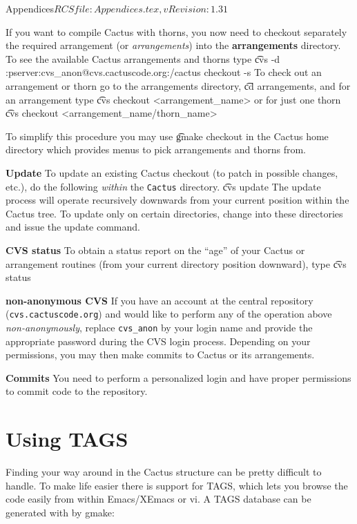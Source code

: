 \begin{cactuspart}{6}{Appendices}{$RCSfile: Appendices.tex,v $}{$Revision: 1.31 $}
\begin{Lentry}
\noindent
  If you want to compile Cactus with thorns, you now need to checkout
  separately the required arrangement (or {\it arrangements})
   into the {\bf arrangements} directory. To see the
  available Cactus arrangements and thorns type
  {\t
    cvs -d :pserver:cvs\_anon@cvs.cactuscode.org:/cactus checkout -s
  }
  To check out an arrangement or thorn go to the arrangements directory,  {\t cd arrangements},
  and  for an arrangement type
{\t
  cvs checkout <arrangement\_name>
  }
        or for just one thorn
{\t
cvs checkout <arrangement\_name/thorn\_name>
}

To simplify this procedure you may use {\t gmake checkout} in the Cactus
home directory which provides menus to pick arrangements and thorns from.


\item[{\bf Update}] To update an existing Cactus checkout (to patch in
  possible changes, etc.), do the following {\em within} the {\tt Cactus} directory.
  {\t
    cvs update
    }
  The update process will operate recursively downwards from your current position
  within the Cactus tree. To update only on certain directories, change
  into these directories and issue the update command.
\item[{\bf CVS status}] To obtain a status report on the ``age'' of your
  Cactus or arrangement routines (from your current directory position
  downward), type
  {\t
    cvs status
    }
\item[{\bf non-anonymous CVS}] If you have an account at the central
  repository ({\tt cvs.cactuscode.org}) and would like to perform
  any of the operation above
  {\em non-anonymously}, replace {\tt cvs\_anon} by your login name
  and provide the appropriate password during the CVS login
  process. Depending on your permissions, you may then make commits to Cactus
  or its arrangements.
\item[{\bf Commits}] You need to perform a personalized login and have
  proper permissions to commit code to the repository.
\end{Lentry}


\chapter{Using TAGS}
\label{sec:usta}
Finding your way around in the Cactus structure can be pretty
difficult to handle. To make life easier there is support for TAGS,
which lets you browse the code easily from within Emacs/XEmacs or vi.
A TAGS database can be generated with by gmake:


\end{cactuspart}
